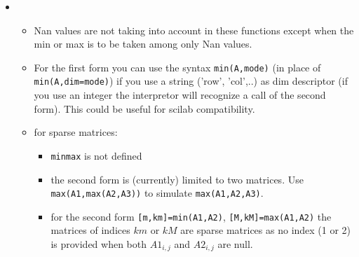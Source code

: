 \begin{mandescription}
\begin{itemize}
\item {}
\begin{itemize} 
\item Nan values are not taking into account in these functions except when the min or max is to 
be taken among only Nan values. 
\item For the first form you can use the syntax \verb+min(A,mode)+ (in place of \verb+min(A,dim=mode)+)
if you use a string ('row', 'col',..) as dim descriptor (if you use an integer the interpretor will 
recognize a call of the second form). This could be useful for scilab compatibility.
\item for sparse matrices: 
\begin{itemize}
\item \verb+minmax+ is not defined
\item the second form is (currently) limited to two matrices. Use \verb+max(A1,max(A2,A3))+ to
simulate \verb+max(A1,A2,A3)+. 
\item for the second form \verb+[m,km]=min(A1,A2)+, \verb+[M,kM]=max(A1,A2)+ the matrices 
      of indices $km$ or $kM$ are sparse matrices as  no index (1 or 2) is provided when 
      both $A1_{i,j}$ and  $A2_{i,j}$ are null.
\end{itemize}
\end{itemize}

\end{itemize}

\end{mandescription}


